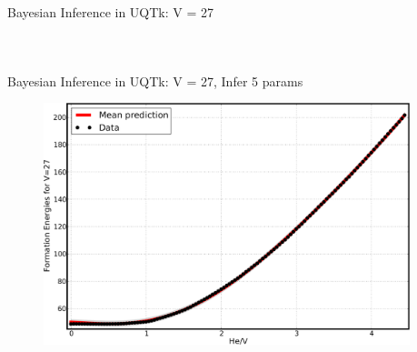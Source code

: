 \documentclass[10pt]{beamer}
\begin{document}
\begin{frame}{Bayesian Inference in UQTk: V = 27}
\begin{columns}[c]
\begin{figure}[ht]
	 			\newline
     		\end{figure}		  		
	\end{columns}
\end{frame}

\begin{frame}{Bayesian Inference in UQTk: V = 27, Infer 5 params}
     \begin{figure}
         \includegraphics[width=0.95\textwidth]{V27most_postpred}
     \end{figure}
\end{frame}
\end{document}
